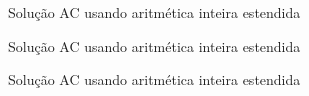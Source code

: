 \begin{frame}[fragile]{Solução AC usando aritmética inteira estendida}
\end{frame}

\begin{frame}[fragile]{Solução AC usando aritmética inteira estendida}
\end{frame}

\begin{frame}[fragile]{Solução AC usando aritmética inteira estendida}
\end{frame}
